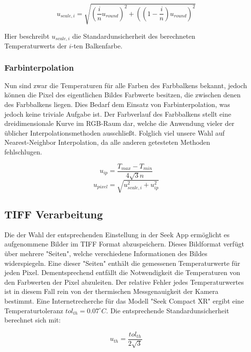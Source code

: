 \documentclass[10pt,a4paper,german]{article}
\begin{document}
\begin{equation}
    u_{scale,i} = \sqrt{\left(\frac{i}{n} u_{round} \right)^2 + \left(\left(1 - \frac{i}{n}\right) u_{round}\right)^2}
\end{equation}

Hier beschreibt $u_{scale,i}$ die Standardunsicherheit des berechneten Temperaturwerts der $i$-ten Balkenfarbe.

\subsubsection{Farbinterpolation}
Nun sind zwar die Temperaturen für alle Farben des Farbbalkens bekannt, jedoch können die Pixel des eigentlichen Bildes Farbwerte besitzen, die zwischen denen des Farbbalkens liegen.
Dies Bedarf dem Einsatz von Farbinterpolation, was jedoch keine triviale Aufgabe ist.
Der Farbverlauf des Farbbalkens stellt eine dreidimensionale Kurve im RGB-Raum dar, welche die Anwendung vieler der üblicher Interpolationsmethoden ausschließt.
Folglich viel unsere Wahl auf Nearest-Neighbor Interpolation, da alle anderen getesteten Methoden fehlschlugen.

\begin{equation}
    u_{ip} = \frac{T_{max} - T_{min}}{4\sqrt{3}n}
\end{equation}
\begin{equation}
    u_{pixel} = \sqrt{u_{scale,i}^2 + u_{ip}^2}
\end{equation}

\subsection{TIFF Verarbeitung}
Die der Wahl der entsprechenden Einstellung in der Seek App ermöglicht es aufgenommene Bilder im TIFF Format abzuspeichern. 
Dieses Bildformat verfügt über mehrere "Seiten", welche verschiedene Informationen des Bildes widerspiegeln.
Eine dieser "Seiten" enthält die gemessenen Temperaturwerte für jeden Pixel.
Dementsprechend entfällt die Notwendigkeit die Temperaturen von den Farbwerten der Pixel abzuleiten.
Der relative Fehler jedes Temperaturwertes ist in diesem Fall rein von der thermischen Messgenauigkeit der Kamera bestimmt.
Eine Internetrecherche für das Modell "Seek Compact XR" ergibt eine Temperaturtoleranz $tol_{th} = 0.07 ^{\circ}C$.
Die entsprechende Standardunsicherheit berechnet sich mit:

\begin{equation}
    u_{th} = \frac{tol_{th}}{2\sqrt{3}}
\end{equation}
\end{document}
